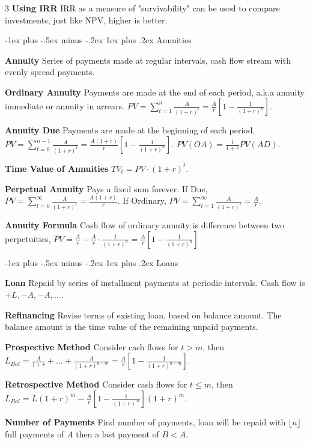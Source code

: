 \documentclass[10pt, landscape]{article}
\makeatletter
\renewcommand{\subsection}{\@startsection{subsection}{3}{0mm}%
                                {-1ex plus -.5ex minus -.2ex}%
                                {1ex plus .2ex}%
                                {\normalfont\small\bfseries}}%
\makeatother
\begin{document}
\begin{multicols*}{3}
\textbf{Using IRR} IRR as a measure of "survivability" can be used to compare investments, just like NPV, higher is better.

\subsection{Annuities}

\textbf{Annuity} Series of payments made at regular intervals, cash flow stream with evenly spread payments.

\textbf{Ordinary Annuity} Payments are made at the end of each period, a.k.a annuity immediate or annuity in arrears. $PV=\sum_{t=1}^n\frac{A}{(1+r)^t}=\frac{A}{r}[1-\frac{1}{(1+r)^n}]$.

\textbf{Annuity Due} Payments are made at the beginning of each period. $PV=\sum_{t=0}^{n-1}\frac{A}{(1+r)^t}=\frac{A(1+r)}{r}[1-\frac{1}{(1+r)^n}]$. $PV(OA)=\frac{1}{1+r}PV(AD)$.

\textbf{Time Value of Annuities} $TV_t=PV \cdot (1+r)^t$.

\textbf{Perpetual Annuity} Pays a fixed sum forever. If Due, $PV=\sum_{t=0}^\infty\frac{A}{(1+r)^t}=\frac{A(1+r)}{r}$. If Ordinary, $PV=\sum_{t=1}^\infty\frac{A}{(1+r)^t}=\frac{A}{r}$.

\textbf{Annuity Formula} Cash flow of ordinary annuity is difference between two perpetuities, $PV=\frac{A}{r}-\frac{A}{r}\cdot\frac{1}{(1+r)^n}=\frac{A}{r}[1-\frac{1}{(1+r)^n}]$

\subsection{Loans}

\textbf{Loan} Repaid by series of installment payments at periodic intervals. Cash flow is $+L, -A, -A,...$.

\textbf{Refinancing} Revise terms of existing loan, based on balance amount. The balance amount is the time value of the remaining unpaid payments.

\textbf{Prospective Method} Consider cash flows for $t>m$, then $L_{Bal}=\frac{A}{1+r}+...+\frac{A}{(1+r)^{n-m}}=\frac{A}{r}[1-\frac{1}{(1+r)^{n-m}}]$.

\textbf{Retrospective Method} Consider cash flows for $t \leq m$, then $L_{Bal}=L(1+r)^m-\frac{A}{r}[1-\frac{1}{(1+r)^m}](1+r)^m$.

\textbf{Number of Payments} Find number of payments, loan will be repaid with $\lfloor n \rfloor$ full payments of $A$ then a last payment of $B < A$.


\end{multicols*}
\end{document}
